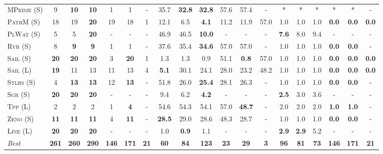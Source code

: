 \documentclass[11pt,landscape]{article}
\begin{document}
\begin{table*}[tb]
{\begin{tabular}{|l||cccccc||cccccc||cccccc||}
\textsc{MPrime} (S)&9&\textbf{10}&\textbf{10}&1&1&-&35.7&\textbf{32.8}&\textbf{32.8}&57.6&57.4&-&*&*&*&*&*&-\\
\textsc{PathM} (S)&18&19&\textbf{20}&19&18&1&12.1&6.5&\textbf{4.1}&11.2&11.9&57.0&1.0&1.0&1.0&\textbf{0.0}&\textbf{0.0}&\textbf{0.0}\\
\textsc{PlWat} (S)&5&5&\textbf{20}&-&-&-&46.9&46.5&\textbf{10.0}&-&-&-&\textbf{7.6}&8.0&9.4&-&-&-\\
\textsc{Rvr} (S)&8&\textbf{9}&\textbf{9}&1&1&-&37.6&35.4&\textbf{34.6}&57.0&57.0&-&1.0&1.0&1.0&\textbf{0.0}&\textbf{0.0}&-\\
\textsc{Sail} (S)&\textbf{20}&\textbf{20}&\textbf{20}&3&\textbf{20}&1&1.3&1.3&0.9&51.1&\textbf{0.8}&57.0&1.0&1.0&1.0&\textbf{0.0}&\textbf{0.0}&\textbf{0.0}\\
\textsc{Sail} (L)&\textbf{19}&11&13&11&13&4&\textbf{5.1}&30.1&24.1&28.0&23.2&48.2&1.0&1.0&1.0&\textbf{0.0}&\textbf{0.0}&\textbf{0.0}\\
\textsc{Stlrs} (S)&4&\textbf{13}&\textbf{13}&12&\textbf{13}&-&51.8&26.0&\textbf{25.4}&28.1&26.3&-&1.0&1.0&1.0&\textbf{0.0}&\textbf{0.0}&-\\
\textsc{Sgr} (S)&\textbf{20}&\textbf{20}&\textbf{20}&-&-&-&9.4&6.2&\textbf{4.2}&-&-&-&\textbf{2.5}&3.0&3.6&-&-&-\\
\textsc{Tpp} (L)&2&2&2&1&\textbf{4}&-&54.6&54.3&54.1&57.0&\textbf{48.7}&-&2.0&2.0&2.0&\textbf{1.0}&\textbf{1.0}&-\\
\textsc{Zeno} (S)&\textbf{11}&\textbf{11}&\textbf{11}&4&\textbf{11}&-&\textbf{28.5}&29.0&28.6&48.3&28.7&-&1.0&1.0&1.0&\textbf{0.0}&\textbf{0.0}&-\\
\textsc{Line} (L)&\textbf{20}&\textbf{20}&\textbf{20}&-&-&-&1.0&\textbf{0.9}&1.1&-&-&-&\textbf{2.9}&\textbf{2.9}&5.2&-&-&-
\\\hline
\textit{Best}&\textbf{261}&\textbf{260}&\textbf{290}&\textbf{146}&\textbf{171}&\textbf{21}&\textbf{60}&\textbf{84}&\textbf{123}&\textbf{23}&\textbf{29}&\textbf{3}&\textbf{96}&\textbf{81}&\textbf{73}&\textbf{146}&\textbf{171}&\textbf{21}\\\hline

        \end{tabular}}
        \caption{}
        \label{tab:all-patty}
        \end{table*}
        
\end{document}
